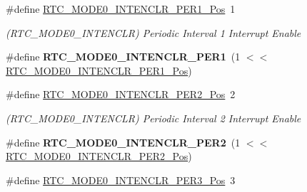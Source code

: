 \begin{DoxyCompactItemize}
\item 
\hypertarget{group___s_a_m_l21___r_t_c_ga115eb649b4c01ce6c4cf8afb9cda07f6}{}\#define \hyperlink{group___s_a_m_l21___r_t_c_ga115eb649b4c01ce6c4cf8afb9cda07f6}{R\+T\+C\+\_\+\+M\+O\+D\+E0\+\_\+\+I\+N\+T\+E\+N\+C\+L\+R\+\_\+\+P\+E\+R1\+\_\+\+Pos}~1\label{group___s_a_m_l21___r_t_c_ga115eb649b4c01ce6c4cf8afb9cda07f6}

\begin{DoxyCompactList}\small\item\em (R\+T\+C\+\_\+\+M\+O\+D\+E0\+\_\+\+I\+N\+T\+E\+N\+C\+L\+R) Periodic Interval 1 Interrupt Enable \end{DoxyCompactList}\item 
\hypertarget{group___s_a_m_l21___r_t_c_ga0bb093b1c5c9e85e94e1b5d1ae7bd643}{}\#define {\bfseries R\+T\+C\+\_\+\+M\+O\+D\+E0\+\_\+\+I\+N\+T\+E\+N\+C\+L\+R\+\_\+\+P\+E\+R1}~(1 $<$$<$ \hyperlink{group___s_a_m_l21___r_t_c_ga115eb649b4c01ce6c4cf8afb9cda07f6}{R\+T\+C\+\_\+\+M\+O\+D\+E0\+\_\+\+I\+N\+T\+E\+N\+C\+L\+R\+\_\+\+P\+E\+R1\+\_\+\+Pos})\label{group___s_a_m_l21___r_t_c_ga0bb093b1c5c9e85e94e1b5d1ae7bd643}

\item 
\hypertarget{group___s_a_m_l21___r_t_c_ga1092e63f860b9a396205d012a5249775}{}\#define \hyperlink{group___s_a_m_l21___r_t_c_ga1092e63f860b9a396205d012a5249775}{R\+T\+C\+\_\+\+M\+O\+D\+E0\+\_\+\+I\+N\+T\+E\+N\+C\+L\+R\+\_\+\+P\+E\+R2\+\_\+\+Pos}~2\label{group___s_a_m_l21___r_t_c_ga1092e63f860b9a396205d012a5249775}

\begin{DoxyCompactList}\small\item\em (R\+T\+C\+\_\+\+M\+O\+D\+E0\+\_\+\+I\+N\+T\+E\+N\+C\+L\+R) Periodic Interval 2 Interrupt Enable \end{DoxyCompactList}\item 
\hypertarget{group___s_a_m_l21___r_t_c_gacd2aa4e9928b52b09fec4cc4b443ef09}{}\#define {\bfseries R\+T\+C\+\_\+\+M\+O\+D\+E0\+\_\+\+I\+N\+T\+E\+N\+C\+L\+R\+\_\+\+P\+E\+R2}~(1 $<$$<$ \hyperlink{group___s_a_m_l21___r_t_c_ga1092e63f860b9a396205d012a5249775}{R\+T\+C\+\_\+\+M\+O\+D\+E0\+\_\+\+I\+N\+T\+E\+N\+C\+L\+R\+\_\+\+P\+E\+R2\+\_\+\+Pos})\label{group___s_a_m_l21___r_t_c_gacd2aa4e9928b52b09fec4cc4b443ef09}

\item 
\hypertarget{group___s_a_m_l21___r_t_c_ga84f5a7551cac675023c5f13a856300fe}{}\#define \hyperlink{group___s_a_m_l21___r_t_c_ga84f5a7551cac675023c5f13a856300fe}{R\+T\+C\+\_\+\+M\+O\+D\+E0\+\_\+\+I\+N\+T\+E\+N\+C\+L\+R\+\_\+\+P\+E\+R3\+\_\+\+Pos}~3\label{group___s_a_m_l21___r_t_c_ga84f5a7551cac675023c5f13a856300fe}


\end{DoxyCompactItemize}

